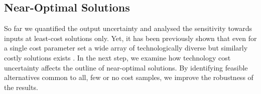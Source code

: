\subsection{Near-Optimal Solutions}

So far we quantified the output uncertainty and analysed the sensitivity towards inputs at least-cost solutions only.
Yet, it has been previously shown that even for a single cost parameter set a wide array of
technologically diverse but similarly costly solutions exists \cite{nearoptimal}.
In the next step, we examine how technology cost uncertainty affects the outline of near-optimal solutions.  
By identifying feasible alternatives common to all, few or no cost samples, we improve the robustness of the results.


